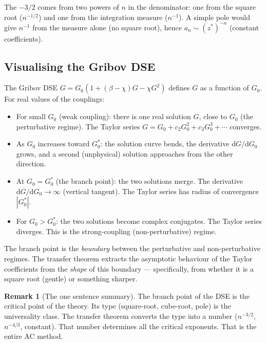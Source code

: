 \documentclass[11pt,a4paper]{article}
\theoremstyle{definition}
\newtheorem*{remark}{Remark}
\newcommand{\dd}{\mathrm{d}}
\begin{document}
The $-3/2$ comes from two powers of $n$ in the denominator: one from the
square root ($n^{-1/2}$) and one from the integration measure ($n^{-1}$).
A simple pole would give $n^{-1}$ from the measure alone (no square root),
hence $a_n \sim (z^*)^{-n}$ (constant coefficients).

\subsection{Visualising the Gribov DSE}

The Gribov DSE $G = G_0(1 + (\beta{-}\chi)G - \chi G^2)$ defines $G$ as a
function of $G_0$. For real values of the couplings:

\begin{itemize}
\item For small $G_0$ (weak coupling): there is one real solution $G$,
      close to $G_0$ (the perturbative regime). The Taylor series
      $G = G_0 + c_2 G_0^2 + c_3 G_0^3 + \cdots$ converges.

\item As $G_0$ increases toward $G_0^*$: the solution curve bends,
      the derivative $\dd G/\dd G_0$ grows, and a second (unphysical)
      solution approaches from the other direction.

\item At $G_0 = G_0^*$ (the branch point): the two solutions merge.
      The derivative $\dd G/\dd G_0 \to \infty$ (vertical tangent).
      The Taylor series has radius of convergence $|G_0^*|$.

\item For $G_0 > G_0^*$: the two solutions become complex conjugates.
      The Taylor series diverges. This is the strong-coupling
      (non-perturbative) regime.
\end{itemize}

The branch point is the \emph{boundary} between the perturbative and
non-perturbative regimes. The transfer theorem extracts the asymptotic
behaviour of the Taylor coefficients from the \emph{shape} of this
boundary --- specifically, from whether it is a square root (gentle) or
something sharper.

\begin{remark}[The one sentence summary]
The branch point of the DSE is the critical point of the theory.
Its type (square-root, cube-root, pole) is the universality class.
The transfer theorem converts the type into a number ($n^{-3/2}$,
$n^{-4/3}$, constant). That number determines all the critical
exponents. That is the entire AC method.
\end{remark}
\end{document}
